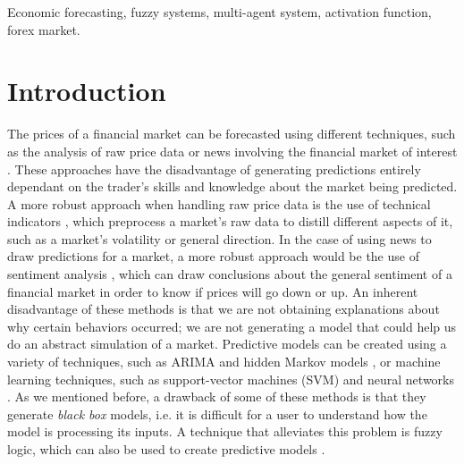 \documentclass{ieeeaccess}
\begin{document}
\begin{keywords}
  Economic forecasting, fuzzy systems, multi-agent system, activation function, forex market.
\end{keywords}

\titlepgskip=-15pt

\maketitle

\section{Introduction} %
\label{section:introduction}

The prices of a financial market can be forecasted using different
techniques, such as the analysis of raw price data or news involving
the financial market of interest \cite{Liu2019}. These approaches have
the disadvantage of generating predictions
entirely dependant on the trader's skills and knowledge about the
market being predicted. 
A more robust approach when handling raw price
data is the use of technical indicators \cite{Alsubaie2019}, which
preprocess a market's raw data to distill different aspects of it,
such as a market's volatility or general direction. In the case of
using news to draw predictions for a market, a more robust approach
would be the use of sentiment analysis \cite{LienMinh2018}
\cite{Cabrera2018}, which can draw conclusions about the general
sentiment of a financial market in order to know if prices will go
down or up. An inherent disadvantage of these methods is that we are not 
obtaining explanations about why certain behaviors occurred; we
are not generating a model that could help us do an abstract
simulation of a market. Predictive models can be created using a variety of
techniques, such as ARIMA \cite{Idrees2019} and hidden Markov models
\cite{Cao2019}, or machine learning techniques, such as support-vector
machines (SVM) \cite{Guo2018} and neural networks \cite{Chen2019a}. As
we mentioned before, a drawback of some of these methods is that they generate \textit{black
box} models, i.e. it is difficult for a user to understand how the
model is processing its inputs. A technique that alleviates this
problem is fuzzy logic, which can also be used to create predictive
models \cite{Jiang2018} \cite{Sang2019} \cite{Chourmouziadis2019}.
\end{document}
